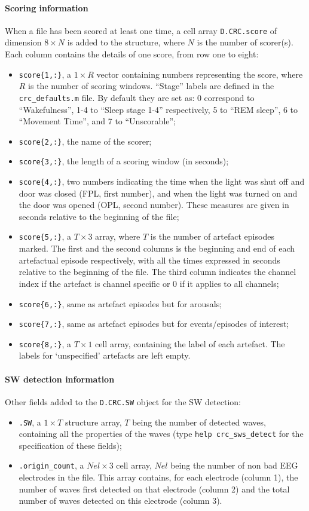 \documentclass[a4paper,titlepage]{article}
\newcommand{\bi}{\begin{itemize}}
\newcommand{\ei}{\end{itemize}}
\begin{document}
\paragraph{Scoring information}
When a file has been scored at least one time, a cell array {\tt D.CRC.score} of dimension $8\times N$ is added to the structure, where $N$ is the number of scorer(s). Each column contains the details of one score, from row one to eight:
\bi
\item{{\tt score\{1,:\}},} a $1\times R$ vector containing numbers representing the score, where $R$ is the number of scoring windows. ``Stage'' labels  are defined in the {\tt crc\_defaults.m} file. By default they are set as: 0 correspond to ``Wakefulness'', 1-4 to ``Sleep stage 1-4'' respectively, 5 to ``REM sleep'', 6 to ``Movement Time'', and 7 to ``Unscorable'';
\item{{\tt score\{2,:\}},} the name of the scorer;
\item{{\tt score\{3,:\}},} the length of a scoring window (in seconds);
\item{{\tt score\{4,:\}},} two numbers indicating the time when the light was shut off and door was closed (FPL, first number), and when the light was turned on and the door was opened (OPL, second number). These measures are given in seconds relative to the beginning of the file;
\item{{\tt score\{5,:\}},} a $T\times 3$ array, where $T$ is the number of artefact episodes marked. The first and the second columns is the beginning and end of each artefactual episode respectively, with all the times expressed in seconds relative to the beginning of the file. The third column indicates the channel index if the artefact is channel specific or 0 if it applies to all channels;
\item{{\tt score\{6,:\}},} same as artefact episodes but for arousals;
\item{{\tt score\{7,:\}},} same as artefact episodes but for events/episodes of interest;
\item{{\tt score\{8,:\}},} a $T\times 1$ cell array, containing the label of each artefact. The labels for `unspecified' artefacts are left empty.
\ei

\paragraph{SW detection information}
Other fields added to the {\tt D.CRC.SW} object for the SW detection:
\bi
\item {\tt .SW}, a $1\times T$ structure array, $T$ being the number of detected waves, containing all the properties of the waves (type {\tt help crc\_sws\_detect} for the specification of these fields);
\item {\tt .origin\_count}, a $N\!el\times 3$ cell array, $N\!el$ being the number of non bad EEG electrodes in the file. This array contains, for each electrode (column 1), the number of waves first detected on that electrode (column 2) and the total number of waves detected on this electrode (column 3).
\ei
\end{document}
